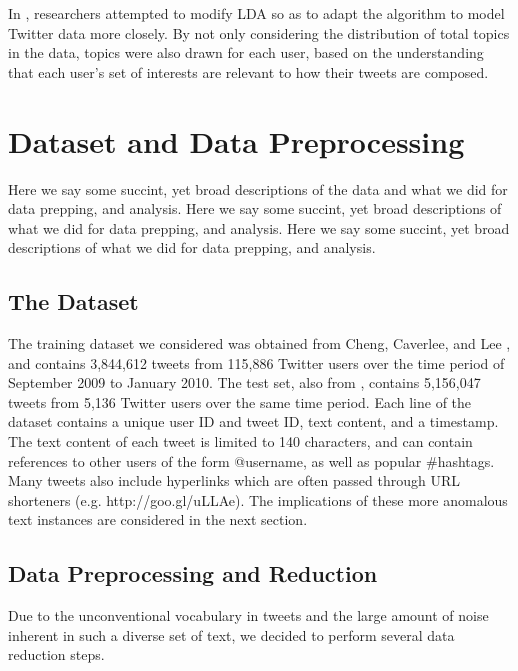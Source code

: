 \documentclass{acm_proc_article-sp}
\begin{document}
\hspace*{5mm}In \cite{zhao2011comparing}, researchers attempted to modify LDA so as to adapt the algorithm to model Twitter data more closely. By not only considering the distribution of total topics in the data, topics were also drawn for each user, based on the understanding that each user's set of interests are relevant to how their tweets are composed.

\section{Dataset and Data Preprocessing}
\hspace*{5mm}Here we say some succint, yet broad descriptions of the data and what we did for data prepping, and analysis. Here we say some succint, yet broad descriptions of what we did for data prepping, and analysis. Here we say some succint, yet broad descriptions of what we did for data prepping, and analysis.

\subsection{The Dataset}
\hspace*{5mm}The training dataset we considered was obtained from Cheng, Caverlee, and Lee \cite{cheng2010content}, and contains 3,844,612 tweets from 115,886 Twitter users over the time period of September 2009 to January 2010. The test set, also from \cite{cheng2010content}, contains 5,156,047 tweets from 5,136 Twitter users over the same time period. Each line of the dataset contains a unique user ID and tweet ID, text content, and a timestamp. The text content of each tweet is limited to 140 characters, and can contain references to other users of the form @username, as well as popular \#hashtags. Many tweets also include hyperlinks which are often passed through URL shorteners (e.g. http://goo.gl/uLLAe). The implications of these more anomalous text instances are considered in the next section.

\subsection{Data Preprocessing and Reduction}
\hspace*{5mm}Due to the unconventional vocabulary in tweets and the large amount of noise inherent in such a diverse set of text, we decided to perform several data reduction steps. 
\end{document}
